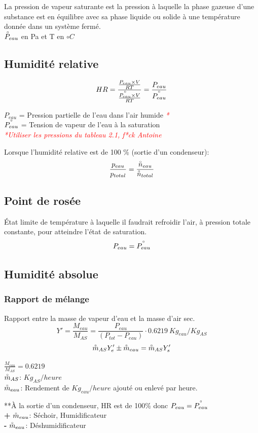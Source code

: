 \documentclass[twocolumn,letterpaper,8pt]{extarticle}
\newcommand{\warning}[1]{\textcolor{red}{\scriptsize\textit{#1}}}
\begin{document}
La pression de vapeur saturante est la pression à laquelle la phase gazeuse d'une substance est en équilibre avec sa phase liquide ou solide à une température donnée dans un système fermé.\\

$\accentset{\circ}{P}_{eau}$ en Pa et T en $\circ C$

\subsection{Humidité relative}

$$HR=\frac{\frac{P_{eau}\times V}{RT}}{\frac{\accentset{\circ}{P_{eau}}\times V}{RT}}=\frac{P_{eau}}{\accentset{\circ}{P_{eau}}}$$

{\footnotesize
$P_{eau}$ = Pression partielle de l'eau dans l'air humide \warning*\\
$\accentset{\circ}{P_{eau}}$ = Tension de vapeur de l'eau à la saturation\\

\warning{*Utiliser les pressions du tableau 2.1, f*ck Antoine}
}

Lorsque l'humidité relative est de 100 \% (sortie d'un condenseur):
$$\frac{p_{eau}}{p_{total}}=\frac{\accentset{\circ}{n}_{eau}}{\accentset{\circ}{n}_{total}}$$

\subsection{Point de rosée}
État limite de température à laquelle il faudrait refroidir l'air, à pression totale constante, pour atteindre l'état de saturation.
$$P_{eau}=\accentset{\circ}{P_{eau}}$$

\subsection{Humidité absolue}
\subsubsection{Rapport de mélange}
Rapport entre la masse de vapeur d'eau et la masse d'air sec.
$$Y'=\frac{M_{eau}}{M_{AS}}=\frac{P_{eau}}{(P_{tot}-P_{eau})}\cdot 0.6219\ Kg_{eau}/Kg_{AS}$$
$$\accentset{\circ}{m}_{AS} Y'_e \pm \accentset{\circ}{m}_{eau} = \accentset{\circ}{m}_{AS} Y'_s$$

{\footnotesize
$\frac{M_{eau}}{M_{AS}}=0.6219$\\
$\accentset{\circ}{m}_{AS}$: $Kg_{AS}/heure$\\
$\accentset{\circ}{m}_{eau}$: Rendement de $Kg_{eau}/heure$ ajouté ou enlevé par heure.

**À la sortie d'un condenseur, HR est de 100\% donc $P_{eau}=\accentset{\circ}{P_{eau}}$\\
\textbf{+} $\accentset{\circ}{m}_{eau}$: Séchoir, Humidificateur\\
\textbf{-} $\accentset{\circ}{m}_{eau}$: Déshumidificateur\\
}
\end{document}
